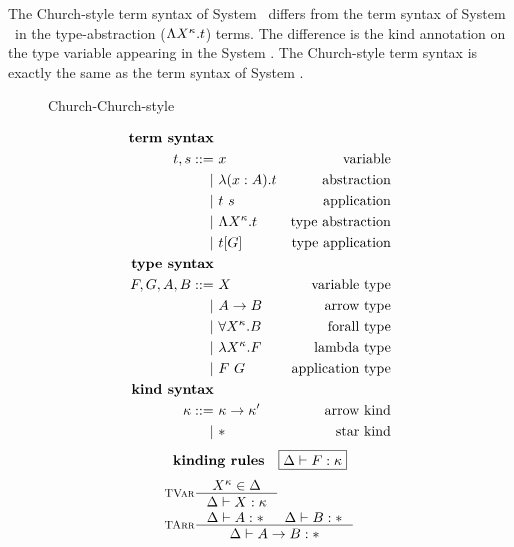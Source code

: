The Church-style term syntax of System \Fw\ differs from the term syntax of System \F\ 
in the type-abstraction ($\Lambda X^\kappa.t$) terms. The difference
is the kind annotation on the type variable appearing in
the System \Fw. The Church-style term syntax is
exactly the same as the term syntax of System \F.

\begin{figure}
\begin{singlespace}
\begin{minipage}{.46\textwidth}
        \begin{center}Church-Church-style\end{center}\vspace*{-1em}
\def\baselinestretch{0}
\small
\begin{align*}
\textbf{term syntax} \\
t,s ::= &~ x               & \text{variable}    \\
      | &~ \lambda(x:A) . t     & \text{abstraction} \\
      | &~ t ~ s           & \text{application} \\
      | &~ \Lambda X^\kappa . t & \text{type abstraction} \\
      | &~ t [G]           & \text{type application} \\
\textbf{type syntax} \\
F,G,A,B ::= &~ X                  & \text{variable type} \\
          | &~ A -> B             & \text{arrow type} \\
          | &~ \forall X^\kappa.B & \text{forall type}   \\
          | &~ \lambda X^\kappa.F      & \text{lambda type}   \\
          | &~ F ~ G              & \text{application type}   \\
\textbf{kind syntax} \\
\kappa ::= &~ \kappa -> \kappa' & \text{arrow kind} \\
         | &~ *                 & \text{star kind}   \\
\end{align*}
\[ \textbf{kinding rules} \quad \framebox{$ \Delta |- F:\kappa $} \]\vspace*{-1em}
\begin{align*}
& \inference[\sc TVar]{X^\kappa \in \Delta}{\Delta |- X:\kappa} \\
& \inference[\sc TArr]{\Delta |- A:* & \Delta |- B:*}{\Delta |- A -> B:*} \\

\end{align*}
\end{minipage}
\end{singlespace}
\end{figure}
